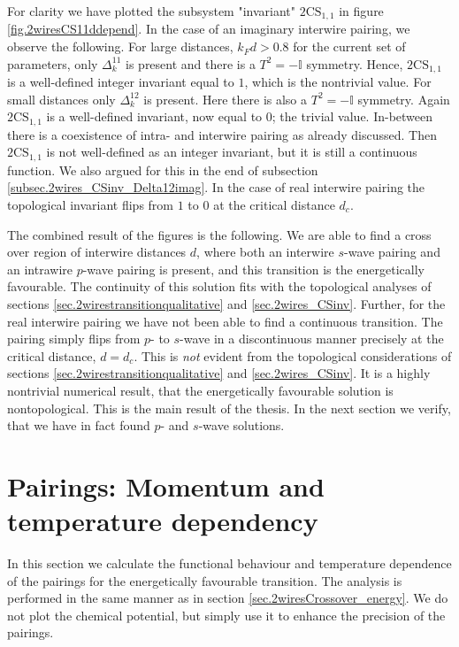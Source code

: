 For clarity we have plotted the subsystem "invariant" $2\text{CS}_{1,1}$ in figure \ref{fig.2wiresCS11ddepend}. In the case of an imaginary interwire pairing, we observe the following. For large distances, $k_Fd > 0.8$ for the current set of parameters, only $\Delta^{11}_k$ is present and there is a $T^2 = -\mathbb{I}$ symmetry. Hence, $2\text{CS}_{1,1}$ is a well-defined integer invariant equal to $1$, which is the nontrivial value. For small distances only $\Delta^{12}_k$ is present. Here there is also a $T^2 = -\mathbb{I}$ symmetry. Again $2\text{CS}_{1,1}$ is a well-defined invariant, now equal to $0$; the trivial value. In-between there is a coexistence of intra- and interwire pairing as already discussed. Then $2\text{CS}_{1,1}$ is not well-defined as an integer invariant, but it is still a continuous function. We also argued for this in the end of subsection \ref{subsec.2wires_CSinv_Delta12imag}. In the case of real interwire pairing the topological invariant flips from $1$ to $0$ at the critical distance $d_c$. 

The combined result of the figures is the following. We are able to find a cross over region of interwire distances $d$, where both an interwire $s$-wave pairing and an intrawire $p$-wave pairing is present, and this transition is the energetically favourable. The continuity of this solution fits with the topological analyses of sections \ref{sec.2wirestransitionqualitative} and \ref{sec.2wires_CSinv}. Further, for the real interwire pairing we have not been able to find a continuous transition. The pairing simply flips from $p$- to $s$-wave in a discontinuous manner precisely at the critical distance, $d = d_c$. This is \textit{not} evident from the topological considerations of sections \ref{sec.2wirestransitionqualitative} and \ref{sec.2wires_CSinv}. It is a highly nontrivial numerical result, that the energetically favourable solution is nontopological. This is the main result of the thesis. In the next section we verify, that we have in fact found $p$- and $s$-wave solutions. 


\section{Pairings: Momentum and temperature dependency} \label{sec.pairingsfunctionalbehaviour}
In this section we calculate the functional behaviour and temperature dependence of the pairings for the energetically favourable transition. The analysis is performed in the same manner as in section \ref{sec.2wiresCrossover_energy}. We do not plot the chemical potential, but simply use it to enhance the precision of the pairings.  

